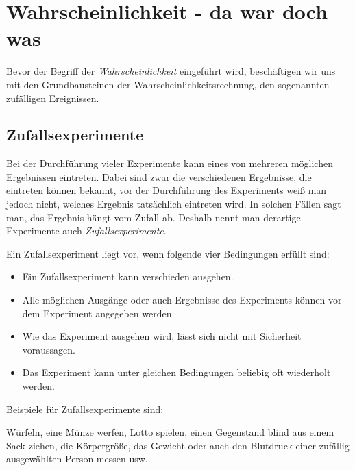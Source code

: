 \documentclass[
  ngerman,
]{book}
\begin{document}
\hypertarget{wahrscheinlichkeit---da-war-doch-was}{%
\section{Wahrscheinlichkeit - da war doch was}\label{wahrscheinlichkeit---da-war-doch-was}}

Bevor der Begriff der \emph{Wahrscheinlichkeit} eingeführt wird, beschäftigen wir uns mit den Grundbausteinen der Wahrscheinlichkeitsrechnung, den sogenannten zufälligen Ereignissen.

\hypertarget{zufallsexperimente}{%
\subsection*{Zufallsexperimente}\label{zufallsexperimente}}

Bei der Durchführung vieler Experimente kann eines von mehreren möglichen Ergebnissen eintreten. Dabei sind zwar die verschiedenen Ergebnisse, die eintreten können bekannt, vor der Durchführung des Experiments weiß man jedoch nicht, welches Ergebnis tatsächlich eintreten wird. In solchen Fällen sagt man, das Ergebnis hängt vom Zufall ab. Deshalb nennt man derartige Experimente auch \emph{Zufallsexperimente}.

Ein Zufallsexperiment liegt vor, wenn folgende vier Bedingungen erfüllt sind:

\begin{itemize}
\item
  Ein Zufallsexperiment kann verschieden ausgehen.
\item
  Alle möglichen Ausgänge oder auch Ergebnisse des Experiments können vor dem Experiment angegeben werden.
\item
  Wie das Experiment ausgehen wird, lässt sich nicht mit Sicherheit voraussagen.
\item
  Das Experiment kann unter gleichen Bedingungen beliebig oft wiederholt werden.
\end{itemize}

Beispiele für Zufallsexperimente sind:

Würfeln, eine Münze werfen, Lotto spielen, einen Gegenstand blind aus einem Sack ziehen, die Körpergröße, das Gewicht oder auch den Blutdruck einer zufällig ausgewählten Person messen usw..

\hypertarget{section-39}{%
\subsubsection*{}\label{section-39}}
\end{document}
